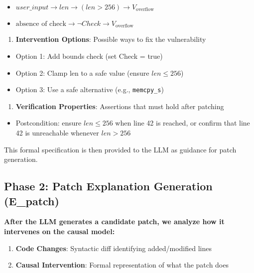 \documentclass[conference,compsoc]{IEEEtran}
\providecommand{\tightlist}{\setlength{\itemsep}{0pt}\setlength{\parskip}{0pt}}
\begin{document}
\begin{itemize}
\item
  \(user\_input \rightarrow len \rightarrow (len > 256) \rightarrow V_{\text{overflow}}\)
\item
  \(\text{absence of check} \rightarrow \lnot Check \rightarrow V_{\text{overflow}}\)
\end{itemize}

\begin{enumerate}
\def\labelenumi{\arabic{enumi}.}
\setcounter{enumi}{4}
\tightlist
\item
  \textbf{Intervention Options}: Possible ways to fix the vulnerability
\end{enumerate}

\begin{itemize}
    \item Option 1: Add bounds check (set Check = true)
    \item Option 2: Clamp len to a safe value (ensure \(len \leq 256\))
    \item Option 3: Use a safe alternative (e.g., \texttt{memcpy\_s})
\end{itemize}

\begin{enumerate}
\def\labelenumi{\arabic{enumi}.}
\setcounter{enumi}{5}
\tightlist
\item
  \textbf{Verification Properties}: Assertions that must hold after
  patching
\end{enumerate}

\begin{itemize}
\tightlist
\item
  Postcondition: ensure \(len \leq 256\) when line 42 is reached, or confirm
  that line 42 is unreachable whenever \(len > 256\)
\end{itemize}

This formal specification is then provided to the LLM as guidance for
patch generation.

\subsection{Phase 2: Patch Explanation Generation
(E\_patch)}\label{phase-2-patch-explanation-generation-e_patch}

\textbf{After the LLM generates a candidate patch, we analyze how it
intervenes on the causal model:}

\begin{enumerate}
\def\labelenumi{\arabic{enumi}.}
\item
  \textbf{Code Changes}: Syntactic diff identifying added/modified lines
\item
  \textbf{Causal Intervention}: Formal representation of what the patch
  does
\end{enumerate}
\end{document}
